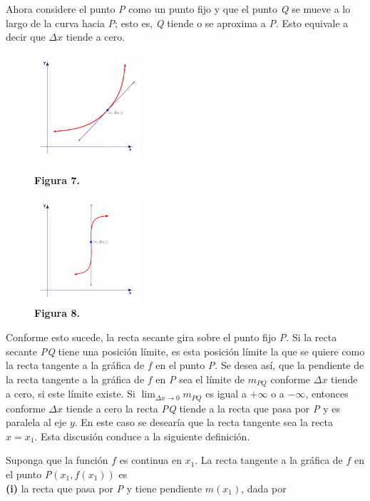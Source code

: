\documentclass[11pt]{report}
\begin{document}
\hspace*{10mm}Ahora considere el  punto \textit{P} como un punto fijo y que el punto \textit{Q} se mueve a lo largo de la curva hacia \textit{P}; esto es, \textit{Q} tiende o se aproxima a \textit{P}. Esto equivale a decir que $\Delta x$ tiende a cero.\\
\begin{figure}
\includegraphics[width=0.35\textwidth]{der_fig4}
\caption*{\textbf{Figura 7.}}
\label{figu:mesh4}
\includegraphics[width=0.35\textwidth]{der_fig5}
\caption*{\textbf{Figura 8.}}
\label{figu:mesh5}
\end{figure}
\hspace*{10mm}Conforme esto sucede, la recta secante gira sobre el punto fijo \textit{P}. Si la recta secante \textit{PQ} tiene una posición límite, es esta posición límite la que se quiere como la recta tangente a la gráfica de $f$ en el punto \textit{P}. Se desea así, que la pendiente de la recta tangente a la gráfica de $f$ en \textit{P} sea el límite de $m_{PQ}$ conforme $\Delta x$ tiende a cero, si este límite existe. Si $\lim_{\Delta x \to 0}m_{PQ}$ es igual a $+\infty$ o a $-\infty$, entonces conforme $\Delta x$ tiende a cero la recta \textit{PQ} tiende a la recta que pasa por \textit{P} y es paralela al eje $y$. En este caso se desearía que la recta tangente sea la recta $x=x_1$. Esta discusión conduce a la siguiente definición.

Suponga que la función $f$ es continua en $x_1$. La recta tangente a la gráfica de $f$ en el punto \textit{P}$(x_1,f(x_1))$ es\\[2mm]
\textbf{(i)} la recta que pasa por \textit{P} y tiene pendiente $m(x_1)$, dada por
\end{document}
